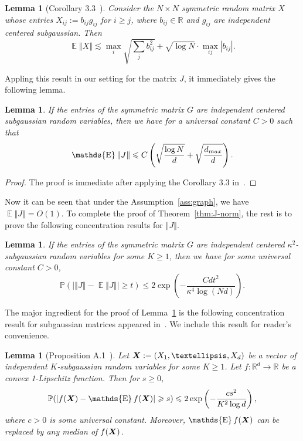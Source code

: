 \documentclass[letterpaper,11pt,reqno]{amsart}
\newtheorem{lem}[thm]{Lemma}
\renewcommand{\le}{\leqslant}
\renewcommand{\ge}{\geqslant}
\newcommand{\norm}[1]{\left\Vert#1\right\Vert}
\newcommand{\abs}[1]{\left\vert#1\right\vert}
\newcommand{\bP}{\mathbb{P}}\newcommand{\bQ}{\mathbb{Q}}\newcommand{\bR}{\mathbb{R}}
\DeclareMathOperator{\E}{\mathds{E}}
\begin{document}
\begin{lem}[Corollary 3.3~\cite{BvH16}]
    Consider the $N\times N$ symmetric random matrix $X$ whose entries $X_{ij} :=b_{ij} g_{ij}$ for $i\ge j$, where $b_{ij} \in \bR$ and $g_{ij}$ are independent centered subgaussian. Then 
    \[
    \E \norm{X} \lesssim \max_i \sqrt{\sum_{j} b_{ij}^2} + \sqrt{\log N} \cdot \max_{ij} \abs{b_{ij}}.
    \]
\end{lem}
Appling this result in our setting for the matrix $J$, it immediately gives the following lemma.
\begin{lem}\label{lem:mean-oper-norm}
    If the entries of the symmetric matrix $G$ are independent centered subgaussian random variables, then we have for a universal constant $C>0$ such that
    \[
    \E \norm{J} \le C \left( \sqrt{\frac{\log N }{d}} + \sqrt{\frac{d_{\rm{max}}}{d}}\right).
    \]
\end{lem}
\begin{proof}
    The proof is immediate after applying the Corollary 3.3 in~\cite{BvH16}.
\end{proof}
Now it can be seen that under the Assumption~\ref{ass:graph}, we have $\E \norm{J} = O(1)$. To complete the proof of Theorem~\ref{thm:J-norm}, the rest is to prove the following concentration results for $\norm{J}$. 


\begin{lem}\label{lem:Jnorm-conc}
     If the entries of the symmetric matrix $G$ are independent centered $\kappa^2$-subgaussian random variables for some $K\ge 1$, then we have for some universal constant $C>0$,
     \[
     \bP(\abs{\norm{J} - \E \norm{J}}\ge t) \le  2\exp\left(-\frac{Cdt^2}{\kappa^4 \log(Nd)}\right).
     \]
\end{lem}

The major ingredient for the proof of Lemma~\ref{lem:Jnorm-conc} is the following concentration result for subgaussian matrices appeared in~\cite{CDG23}. We include this result for reader's convenience.

\begin{lem}[Proposition A.1~\cite{CDG23}]
Let $\mvX:=(X_1,\ldots, X_d)$ be a vector of independent $K$-subgaussian random variables for some $K\ge 1$. Let $f:\bR^d \to \bR$ be a convex 1-Lipschitz function. Then for $s\ge 0$,
\[
\bP(\abs{f(\mvX) - \E f(\mvX)}\ge s) \le 2 \exp\left(-\frac{cs^2}{K^2 \log d}\right),
\]
where $c>0$ is some universal constant. Moreover, $\E f(\mvX)$ can be replaced by any median of $f(\boldsymbol{X})$. 
\end{lem}
\end{document}
